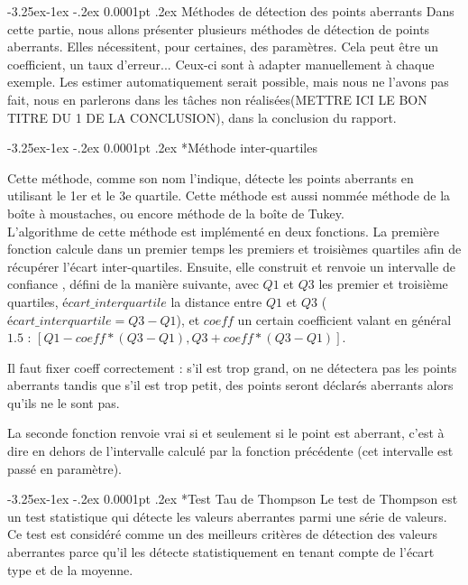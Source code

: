 \documentclass[a4paper,12pt]{article} %
\makeatletter
\renewcommand\paragraph{\@startsection{paragraph}{4}{\z@}%
                                      {-3.25ex\@plus -1ex \@minus -.2ex}%
                                      {0.0001pt \@plus .2ex}%
                                      {\normalfont\normalsize\bfseries}}
\renewcommand\subparagraph{\@startsection{subparagraph}{5}{\z@}%
                                      {-3.25ex\@plus -1ex \@minus -.2ex}%
                                      {0.0001pt \@plus .2ex}%
                                      {\normalfont\normalsize\bfseries}}
\makeatother
\begin{document}
				    
				
				

				\paragraph{Méthodes de détection des points aberrants}
    			    Dans cette partie, nous allons présenter plusieurs méthodes de détection de points aberrants. Elles nécessitent, pour certaines, des paramètres. Cela peut être un coefficient, un taux d'erreur... Ceux-ci sont à adapter manuellement à chaque exemple. Les estimer automatiquement serait possible, mais nous ne l'avons pas fait, nous en parlerons dans les tâches non réalisées(METTRE ICI LE BON TITRE DU 1 DE LA CONCLUSION), dans la conclusion du rapport.
                    
					\subparagraph*{Méthode inter-quartiles}
                        					
                       Cette méthode, comme son nom l'indique, détecte les points aberrants en utilisant le 1er et le 3e quartile. Cette méthode est aussi nommée méthode de la boîte à moustaches, ou encore méthode de la boîte de Tukey. \\
                       
                       L'algorithme de cette méthode est implémenté en deux fonctions. La première fonction calcule dans un premier temps les premiers et troisièmes quartiles afin de récupérer l'écart inter-quartiles. Ensuite, elle construit et renvoie un intervalle de confiance , défini de la manière suivante, avec $Q1$ et $Q3$ les premier et troisième quartiles, $écart\_interquartile$ la distance entre $Q1$ et $Q3$ ($écart\_interquartile = Q3 - Q1$), et $coeff$ un certain coefficient valant en général $1.5$ : $[Q1 - coeff*(Q3 - Q1), Q3 +coeff*(Q3 - Q1 )]$.
                       
                       Il faut fixer coeff correctement : s'il est trop grand, on ne détectera pas les points aberrants tandis que s'il est trop petit, des points seront déclarés aberrants alors qu'ils ne le sont pas.
                       
                       La seconde fonction renvoie vrai si et seulement si le point est aberrant, c'est à dire en dehors de l'intervalle calculé par la fonction précédente (cet intervalle est passé en paramètre).
                       
                    \subparagraph*{Test Tau de Thompson}
                    Le test de Thompson est un test statistique qui détecte les valeurs aberrantes parmi une série de valeurs. Ce test est considéré comme un des meilleurs critères de détection des valeurs aberrantes parce qu'il les détecte statistiquement en tenant compte de l'écart type et de la moyenne.\\
                    
\end{document}

